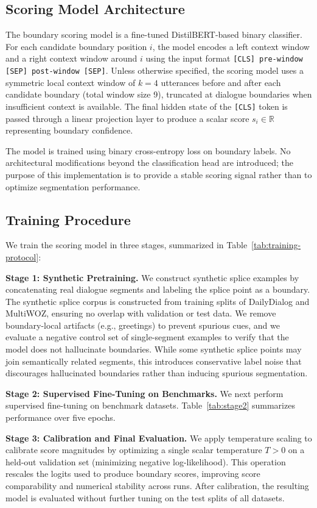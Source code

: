 \documentclass{article}
\begin{document}
\subsection{Scoring Model Architecture}
The boundary scoring model is a fine-tuned DistilBERT-based binary
classifier. For each candidate boundary position $i$, the model
encodes a left context window and a right context window around $i$
using the input format \texttt{[CLS] pre-window [SEP] post-window
  [SEP]}. Unless otherwise specified, the scoring model uses a
symmetric local context window of $k{=}4$ utterances before and after
each candidate boundary (total window size 9), truncated at dialogue
boundaries when insufficient context is available. The final hidden state
of the \texttt{[CLS]} token is passed through a linear projection
layer to produce a scalar score $s_i \in \mathbb{R}$ representing
boundary confidence.

The model is trained using binary cross-entropy loss on boundary
labels. No architectural modifications beyond the classification head
are introduced; the purpose of this implementation is to provide a
stable scoring signal rather than to optimize segmentation
performance.

\subsection{Training Procedure}

We train the scoring model in three stages, summarized in
Table~\ref{tab:training-protocol}:

\textbf{Stage 1: Synthetic Pretraining.}  We construct synthetic
splice examples by concatenating real dialogue segments and labeling
the splice point as a boundary. The synthetic splice corpus is
constructed from training splits of DailyDialog and MultiWOZ, ensuring no overlap with
validation or test data. We remove boundary-local artifacts (e.g.,
greetings) to prevent spurious cues, and we evaluate a negative
control set of single-segment examples to verify that the model does
not hallucinate boundaries. While some synthetic splice points may
join semantically related segments, this introduces conservative label
noise that discourages hallucinated boundaries rather than inducing
spurious segmentation.

\textbf{Stage 2: Supervised Fine-Tuning on Benchmarks.} 
We next perform supervised fine-tuning on benchmark
datasets. Table~\ref{tab:stage2} summarizes performance over five
epochs.

\textbf{Stage 3: Calibration and Final Evaluation.}
We apply temperature scaling to calibrate score magnitudes by
optimizing a single scalar temperature $T>0$ on a held-out validation
set (minimizing negative log-likelihood). This operation rescales the
logits used to produce boundary scores, improving score comparability
and numerical stability across runs. After calibration, the resulting
model is evaluated without further tuning on the test splits of all
datasets.
\end{document}
